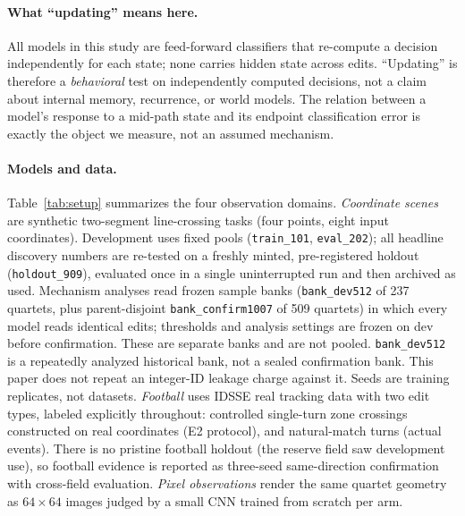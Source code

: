 \paragraph{What ``updating'' means here.} All models in this study are
feed-forward classifiers that re-compute a decision independently for each
state; none carries hidden state across edits. ``Updating'' is therefore a
\emph{behavioral} test on independently computed decisions, not a claim
about internal memory, recurrence, or world models. The relation between a
model's response to a mid-path state and its endpoint classification error
is exactly the object we measure, not an assumed mechanism.

\paragraph{Models and data.} Table~\ref{tab:setup} summarizes the four
observation domains. \emph{Coordinate scenes} are synthetic two-segment
line-crossing tasks (four points, eight input coordinates). Development
uses fixed pools (\texttt{train\_101}, \texttt{eval\_202}); all headline
discovery numbers are re-tested on a freshly minted, pre-registered holdout
(\texttt{holdout\_909}), evaluated once in a single uninterrupted run and
then archived as used. Mechanism analyses read frozen sample banks
(\texttt{bank\_dev512} of 237 quartets, plus parent-disjoint
\texttt{bank\_confirm1007} of 509 quartets) in which every model reads
identical edits; thresholds and analysis settings are frozen on dev before
confirmation. These are separate banks and are not pooled.
\texttt{bank\_dev512} is a repeatedly analyzed historical bank, not a
sealed confirmation bank. This paper does not repeat an integer-ID leakage
charge against it. Seeds are training replicates, not datasets. \emph{Football} uses IDSSE real tracking data with two edit
types, labeled explicitly throughout: controlled single-turn zone
crossings constructed on real coordinates (E2 protocol), and natural-match
turns (actual events). There is no pristine football holdout (the reserve
field saw development use), so football evidence is reported as
three-seed same-direction confirmation with cross-field evaluation.
\emph{Pixel observations} render the same quartet geometry as $64\times64$
images judged by a small CNN trained from scratch per arm.

